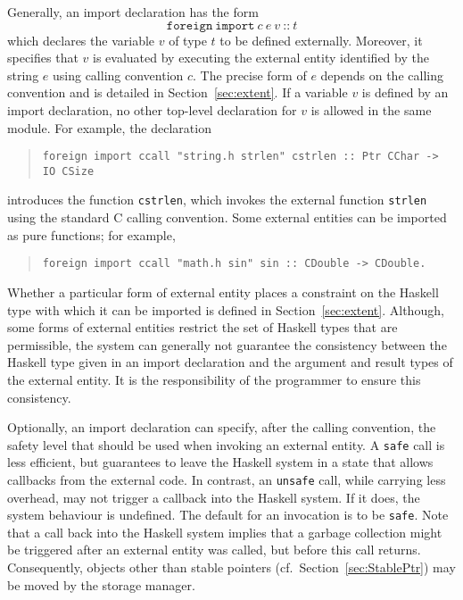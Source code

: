\documentclass[a4paper,twosides]{article}
\newcommand{\code}[1]{\texttt{#1}}      %
\begin{document}
Generally, an import declaration has the form
%
\[
\code{foreign}~\code{import}~c~e~v~\code{{::}}~t
\]
%
which declares the variable $v$ of type $t$ to be defined externally.
Moreover, it specifies that $v$ is evaluated by executing the external entity
identified by the string $e$ using calling convention $c$.  The precise form
of $e$ depends on the calling convention and is detailed in
Section~\ref{sec:extent}.  If a variable $v$ is defined by an import
declaration, no other top-level declaration for $v$ is allowed in the same
module.  For example, the declaration
%
\begin{quote}
\begin{verbatim}
foreign import ccall "string.h strlen" cstrlen :: Ptr CChar -> IO CSize
\end{verbatim}
\end{quote}
%
introduces the function \code{cstrlen}, which invokes the external function
\code{strlen} using the standard C calling convention.  Some external entities
can be imported as pure functions; for example,
%
\begin{quote}
\begin{verbatim}
foreign import ccall "math.h sin" sin :: CDouble -> CDouble.
\end{verbatim}
\end{quote}
%
Whether a particular form of external entity places a constraint on the
Haskell type with which it can be imported is defined in
Section~\ref{sec:extent}.  Although, some forms of external entities restrict
the set of Haskell types that are permissible, the system can generally not
guarantee the consistency between the Haskell type given in an import
declaration and the argument and result types of the external entity.  It is
the responsibility of the programmer to ensure this consistency.

Optionally, an import declaration can specify, after the calling convention,
the safety level that should be used when invoking an external entity.  A
\code{safe} call is less efficient, but guarantees to leave the Haskell system
in a state that allows callbacks from the external code.  In contrast, an
\code{unsafe} call, while carrying less overhead, may not trigger a callback
into the Haskell system.  If it does, the system behaviour is undefined.  The
default for an invocation is to be \code{safe}.  Note that a call back into
the Haskell system implies that a garbage collection might be triggered after
an external entity was called, but before this call returns.  Consequently,
objects other than stable pointers (cf.\ Section~\ref{sec:StablePtr}) may be
moved by the storage manager.
\end{document}
